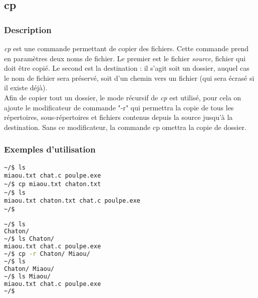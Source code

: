\subsection*{cp}
\subsubsection*{Description}
\emph{cp} est une commande permettant de copier des fichiers.
Cette commande prend en paramètres deux noms de fichier. Le premier est le fichier \emph{source}, fichier qui doit être copié. Le second est la destination : il s'agit soit un dossier, auquel cas le nom de fichier sera préservé, soit d'un chemin vers un fichier (qui sera écrasé si il existe déjà).\\
Afin de copier tout un dossier, le mode récursif de \emph{cp} est utilisé, pour cela on ajoute le modificateur de commande "-r" qui permettra la copie de tous les répertoires, sous-répertoires et fichiers contenus depuis la source jusqu'à la destination.
Sans ce modificateur, la commande cp omettra la copie de dossier.

\subsubsection*{Exemples d'utilisation}

\begin{lstlisting}[caption=copie de fichier]
~/$ ls
miaou.txt chat.c poulpe.exe
~/$ cp miaou.txt chaton.txt
~/$ ls
miaou.txt chaton.txt chat.c poulpe.exe
~/$
\end{lstlisting}

\begin{lstlisting}[language=bash,caption=copie de dossier]
~/$ ls
Chaton/
~/$ ls Chaton/
miaou.txt chat.c poulpe.exe
~/$ cp -r Chaton/ Miaou/
~/$ ls
Chaton/ Miaou/
~/$ ls Miaou/
miaou.txt chat.c poulpe.exe
~/$
\end{lstlisting}
